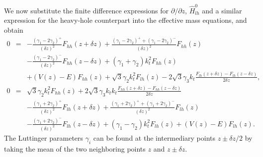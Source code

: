 We now substitute the finite difference expressions for $\partial/\partial z$,
$\hat{H}_{lh}^{0}$ and a similar expression for the heavy-hole counterpart
into the effective mass equations, and obtain\begin{eqnarray}
0 & = & -\frac{\left(\gamma_{1}-2\gamma_{2}\right)^{+}}{(\delta z)^{2}}F_{hh}(z+\delta z)+\frac{\left(\gamma_{1}-2\gamma_{2}\right)^{+}+\left(\gamma_{1}-2\gamma_{2}\right)^{-}}{(\delta z)^{2}}F_{hh}(z)\nonumber \\
 &  & -\frac{\left(\gamma_{1}-2\gamma_{2}\right)^{-}}{(\delta z)^{2}}F_{hh}(z-\delta z)+(\gamma_{1}+\gamma_{2})k_{t}^{2}F_{hh}(z)\nonumber \\
 &  & +\left(V(z)-E\right)F_{hh}(z)+\sqrt{3}\gamma_{2}k_{t}^{2}F_{lh}(z)-2\sqrt{3}\gamma_{3}k_{t}\frac{F_{lh}(z+\delta z)-F_{lh}(z-\delta z)}{2\delta z},\\
0 & = & \sqrt{3}\gamma_{2}k_{t}^{2}F_{hh}(z)+2\sqrt{3}\gamma_{3}k_{t}k_{t}\frac{F_{hh}(z+\delta z)-F_{hh}(z-\delta z)}{2\delta z}\nonumber \\
 &  & -\frac{\left(\gamma_{1}+2\gamma_{2}\right)^{+}}{(\delta z)^{2}}F_{lh}(z+\delta z)+\frac{\left(\gamma_{1}+2\gamma_{2}\right)^{+}+\left(\gamma_{1}+2\gamma_{2}\right)^{-}}{(\delta z)^{2}}F_{lh}(z)\nonumber \\
 &  & -\frac{\left(\gamma_{1}+2\gamma_{2}\right)^{-}}{(\delta z)^{2}}F_{lh}(z-\delta z)+(\gamma_{1}-\gamma_{2})k_{t}^{2}F_{lh}(z)+\left(V(z)-E\right)F_{lh}(z).\end{eqnarray}
The Luttinger parameters $\gamma_{i}$ can be found at the intermediary
points $z\pm\delta z/2$ by taking the mean of the two neighboring
points $z$ and $z\pm\delta z$.

